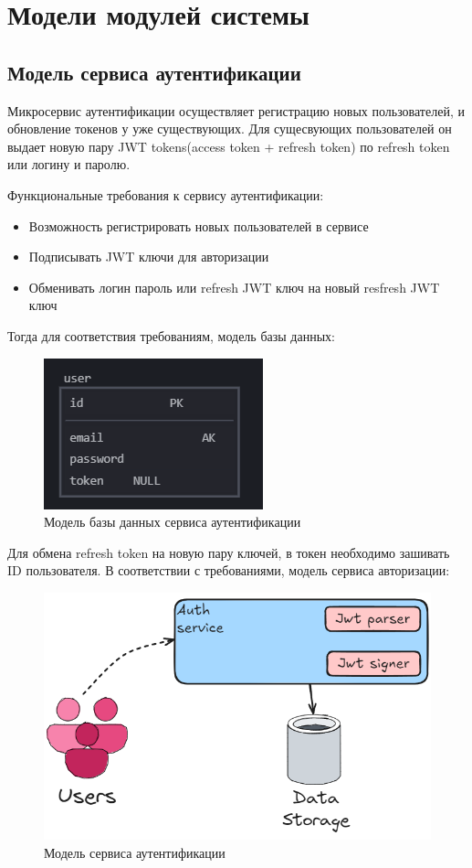 \section{Модели модулей системы}
\subsection{Модель сервиса аутентификации}

Микросервис аутентификации осуществляет регистрацию новых пользователей, и обновление токенов у уже существующих.
Для сущесвующих пользователей он выдает новую пару JWT tokens(access token + refresh token) по refresh token или логину
и паролю.

Функциональные требования к сервису аутентификации:
\begin{itemize}
  \item Возможность регистрировать новых пользователей в сервисе
  \item Подписывать JWT ключи для авторизации
  \item Обменивать логин пароль или refresh JWT ключ на новый resfresh JWT ключ
\end{itemize}

Тогда для соответствия требованиям, модель базы данных:
\begin{figure}[H]%
	\begin{center}
		\includegraphics[width=.5\columnwidth]{./img/auth_db_model.png}%
	\end{center}
	\caption{Модель базы данных сервиса аутентификации}%
	\label{pic:auth_db}%
\end{figure}


Для обмена refresh token на новую пару ключей, в токен необходимо зашивать ID пользователя.
В соответствии с требованиями, модель сервиса авторизации:
\begin{figure}[H]%
	\begin{center}
		\includegraphics[width=.7\columnwidth]{./img/auth_model.png}%
	\end{center}
	\caption{Модель сервиса аутентификации}%
	\label{pic:auth_model}%
\end{figure}


